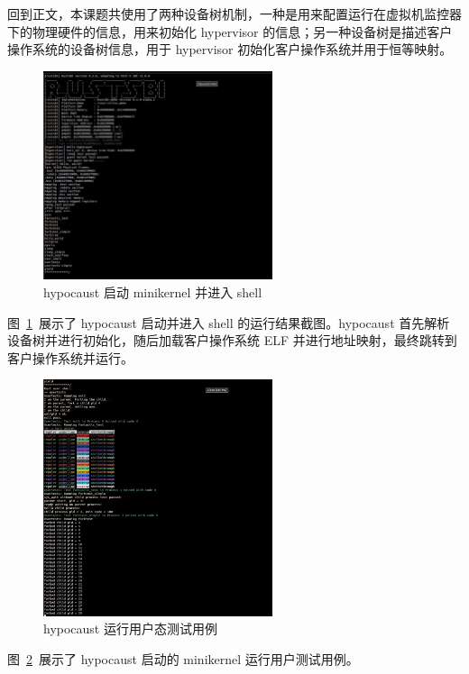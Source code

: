 回到正文，本课题共使用了两种设备树机制，一种是用来配置运行在虚拟机监控器下的物理硬件的信息，用来初始化 hypervisor 的信息；另一种设备树是描述客户操作系统的设备树信息，用于 hypervisor 初始化客户操作系统并用于恒等映射。
\begin{figure}[]
    \centering
    \includegraphics[width=0.6\textwidth]{thesis-images/hypocaust-run1.png}
    \caption{hypocaust 启动 minikernel 并进入 shell}\label{fig:hypocaust-run1}
\end{figure}

图~\ref{fig:hypocaust-run1}~展示了 hypocaust 启动并进入 shell 的运行结果截图。hypocaust 首先解析设备树并进行初始化，随后加载客户操作系统 ELF 并进行地址映射，最终跳转到客户操作系统并运行。

\begin{figure}[]
    \centering
    \includegraphics[width=0.6\textwidth]{thesis-images/hypocaust-run-2.png}
    \caption{hypocaust 运行用户态测试用例}\label{fig:hypocaust-run2}
\end{figure}

图~\ref{fig:hypocaust-run2}~展示了 hypocaust 启动的 minikernel 运行用户测试用例。

